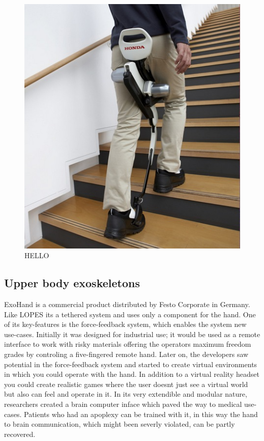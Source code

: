 \documentclass[letterpaper, 10 pt, conference]{ieeeconf}  %
\begin{document}
\begin{figure}[H]
  \centering
    \includegraphics[scale=0.5]{img/honda}
  \caption{HELLO}
\end{figure}
\newpage



\subsection{Upper body exoskeletons}

ExoHand is a commercial product distributed by Festo Corporate in Germany. Like LOPES its a tethered system and uses only a component for the hand. One of its key-features is the force-feedback system, which enables the system new use-cases. Initially it was designed for industrial use; it would be used as a remote interface to work with risky materials offering the operators maximum freedom grades by controling a five-fingered remote hand. Later on, the developers saw potential in the force-feedback system and started to create virtual environments in which you could operate with the hand. In addition to a virtual reality headset you could create realistic games where the user doesnt just see a virtual world but also can feel and operate in it. In its very extendible and modular nature, researchers created a brain computer inface which paved the way to medical use-cases. Patients who had an apoplexy can be trained with it, in this way the hand to brain communication, which might been severly violated, can be partly recovered.
\end{document}
